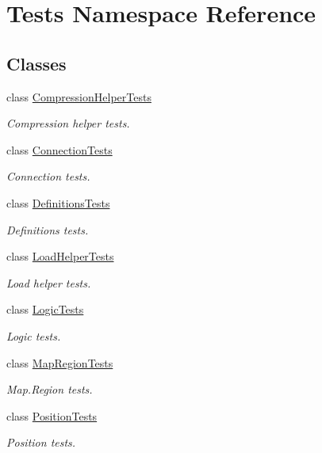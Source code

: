 \hypertarget{namespaceTests}{}\section{Tests Namespace Reference}
\label{namespaceTests}
\subsection*{Classes}
\begin{DoxyCompactItemize}
\item 
class \hyperlink{classTests_1_1CompressionHelperTests}{Compression\+Helper\+Tests}
\begin{DoxyCompactList}\small\item\em Compression helper tests. \end{DoxyCompactList}\item 
class \hyperlink{classTests_1_1ConnectionTests}{Connection\+Tests}
\begin{DoxyCompactList}\small\item\em Connection tests. \end{DoxyCompactList}\item 
class \hyperlink{classTests_1_1DefinitionsTests}{Definitions\+Tests}
\begin{DoxyCompactList}\small\item\em Definitions tests. \end{DoxyCompactList}\item 
class \hyperlink{classTests_1_1LoadHelperTests}{Load\+Helper\+Tests}
\begin{DoxyCompactList}\small\item\em Load helper tests. \end{DoxyCompactList}\item 
class \hyperlink{classTests_1_1LogicTests}{Logic\+Tests}
\begin{DoxyCompactList}\small\item\em Logic tests. \end{DoxyCompactList}\item 
class \hyperlink{classTests_1_1MapRegionTests}{Map\+Region\+Tests}
\begin{DoxyCompactList}\small\item\em Map.\+Region tests. \end{DoxyCompactList}\item 
class \hyperlink{classTests_1_1PositionTests}{Position\+Tests}
\begin{DoxyCompactList}\small\item\em Position tests. \end{DoxyCompactList}\end{DoxyCompactItemize}
